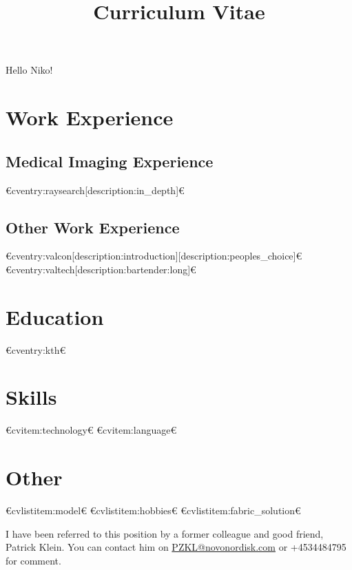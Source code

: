 
\title{Curriculum Vitae}



\newcommand{\role}{Niko's Friend}
\newcommand{\company}{Niko's Heart A/S}



  \makecvtitle
  Hello Niko!

  \section{Work Experience}
  \subsection{Medical Imaging Experience}
  €cventry:raysearch[description:in_depth]€
  \subsection{Other Work Experience}
  €cventry:valcon[description:introduction][description:peoples_choice]€
  €cventry:valtech[description:bartender:long]€

  \section{Education}
  €cventry:kth€

  \section{Skills}
  €cvitem:technology€
  €cvitem:language€

  \section{Other}
  €cvlistitem:model€
  €cvlistitem:hobbies€
  €cvlistitem:fabric_solution€

  \vspace{1cm}
  I have been referred to this position by a former colleague and good friend, Patrick Klein.
  You can contact him on \href{mailto:PZKL@novonordisk.com}{PZKL@novonordisk.com} or +4534484795 for comment.
  
